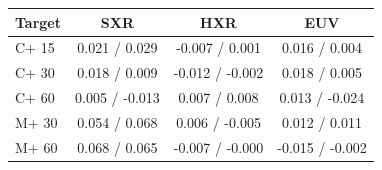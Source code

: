 \begin{tabular}{lccc}
\toprule
Target & SXR & HXR & EUV \\
\midrule
C+ 15 & 0.021 / 0.029 & -0.007 / 0.001 & 0.016 / 0.004 \\
C+ 30 & 0.018 / 0.009 & -0.012 / -0.002 & 0.018 / 0.005 \\
C+ 60 & 0.005 / -0.013 & 0.007 / 0.008 & 0.013 / -0.024 \\
M+ 30 & 0.054 / 0.068 & 0.006 / -0.005 & 0.012 / 0.011 \\
M+ 60 & 0.068 / 0.065 & -0.007 / -0.000 & -0.015 / -0.002 \\
\bottomrule
\end{tabular}
